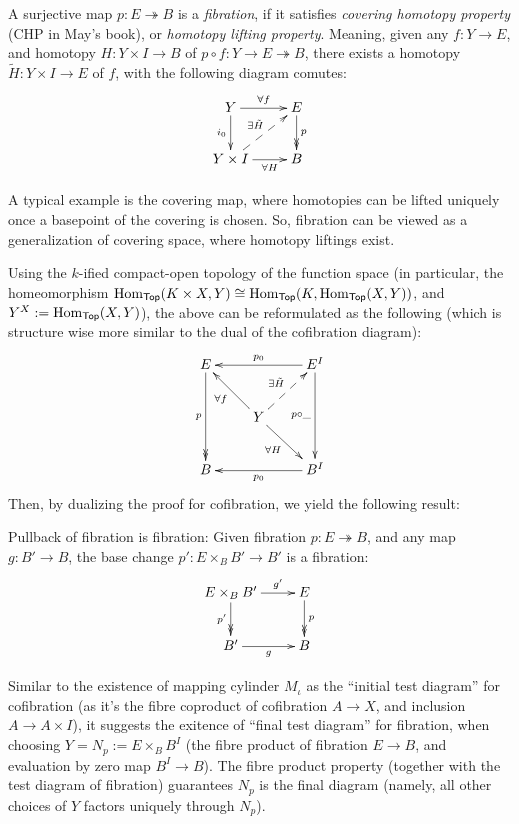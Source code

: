\documentclass{article}
\begin{document}
\begin{defn}
    A surjective map $p:E\twoheadrightarrow B$ is a \emph{fibration}, if it satisfies \emph{covering homotopy property} (CHP in May's book), or \emph{homotopy lifting property}. Meaning, given any $f:Y\rightarrow E$, and homotopy $H:Y\times I\rightarrow B$ of $p\circ f:Y\rightarrow E\twoheadrightarrow B$, there exists a homotopy $\tilde{H}:Y\times I\rightarrow E$ of $f$, with the following diagram comutes:
    \[\xymatrix{
        Y \ar[d]_-{i_0} \ar[r]^-{\forall f} & E \ar@{->>}[d]^-{p}\\
        Y\times I \ar@{-->}[ur]^-{\exists \tilde{H}} \ar[r]_-{\forall H} & B
    }\]
\end{defn}
A typical example is the covering map, where homotopies can be lifted uniquely once a basepoint of the covering is chosen. So, fibration can be viewed as a generalization of covering space, where homotopy liftings exist.

Using the $k$-ified compact-open topology of the function space (in particular, the homeomorphism $\mathrm{Hom}_{\mathsf{Top}} (K\times X,Y)\cong \mathrm{Hom}_{\mathsf{Top}} (K,\mathrm{Hom}_{\mathsf{Top}} (X,Y))$, and $Y^X:=\mathrm{Hom}_{\mathsf{Top}} (X,Y)$), the above can be reformulated as the following (which is structure wise more similar to the dual of the cofibration diagram):
\[\xymatrix{
    E \ar@{->>}[dd]_-{p} && E^I \ar[ll]_-{p_0} \ar[dd]_-{p\circ \_}\\
    & Y \ar[ul]^-{\forall f} \ar[dr]_-{\forall H} \ar@{-->}[ur]^-{\exists \tilde{H}}\\
    B && B^I \ar[ll]^-{p_0}
}\]
Then, by dualizing the proof for cofibration, we yield the following result:
\begin{lem}
    Pullback of fibration is fibration: Given fibration $p:E\twoheadrightarrow B$, and any map $g:B'\rightarrow B$, the base change $p':E\times_B B' \rightarrow B'$ is a fibration:
    \[\xymatrix{
        E\times_B B' \ar[r]^-{g'} \ar@{->>}[d]_-{p'} & E \ar@{->>}[d]^-{p}\\
        B' \ar[r]_-{g}& B
    }\]
\end{lem}

\hfil

Similar to the existence of mapping cylinder $M_\iota$ as the ``initial test diagram'' for cofibration (as it's the fibre coproduct of cofibration $A\rightarrow X$, and inclusion $A\rightarrow A\times I$), it suggests the exitence of ``final test diagram'' for fibration, when choosing $Y=N_p := E\times_B B^I$ (the fibre product of fibration $E\rightarrow B$, and evaluation by zero map $B^I\rightarrow B$). The fibre product property (together with the test diagram of fibration) guarantees $N_p$ is the final diagram (namely, all other choices of $Y$ factors uniquely through $N_p$).
\end{document}
